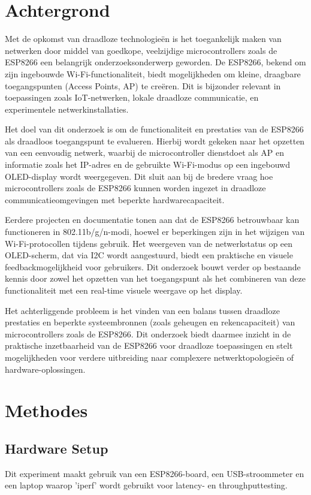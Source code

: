 \documentclass[conference]{IEEEtran}
\begin{document}
\section{Achtergrond}
Met de opkomst van draadloze technologieën is het toegankelijk maken van netwerken door middel van goedkope, veelzijdige microcontrollers zoals de ESP8266 een belangrijk onderzoeksonderwerp geworden. De ESP8266, bekend om zijn ingebouwde Wi-Fi-functionaliteit, biedt mogelijkheden om kleine, draagbare toegangspunten (Access Points, AP) te creëren. Dit is bijzonder relevant in toepassingen zoals IoT-netwerken, lokale draadloze communicatie, en experimentele netwerkinstallaties.

Het doel van dit onderzoek is om de functionaliteit en prestaties van de ESP8266 als draadloos toegangspunt te evalueren. Hierbij wordt gekeken naar het opzetten van een eenvoudig netwerk, waarbij de microcontroller dienstdoet als AP en informatie zoals het IP-adres en de gebruikte Wi-Fi-modus op een ingebouwd OLED-display wordt weergegeven. Dit sluit aan bij de bredere vraag hoe microcontrollers zoals de ESP8266 kunnen worden ingezet in draadloze communicatieomgevingen met beperkte hardwarecapaciteit.

Eerdere projecten en documentatie tonen aan dat de ESP8266 betrouwbaar kan functioneren in 802.11b/g/n-modi, hoewel er beperkingen zijn in het wijzigen van Wi-Fi-protocollen tijdens gebruik. Het weergeven van de netwerkstatus op een OLED-scherm, dat via I2C wordt aangestuurd, biedt een praktische en visuele feedbackmogelijkheid voor gebruikers. Dit onderzoek bouwt verder op bestaande kennis door zowel het opzetten van het toegangspunt als het combineren van deze functionaliteit met een real-time visuele weergave op het display.

Het achterliggende probleem is het vinden van een balans tussen draadloze prestaties en beperkte systeembronnen (zoals geheugen en rekencapaciteit) van microcontrollers zoals de ESP8266. Dit onderzoek biedt daarmee inzicht in de praktische inzetbaarheid van de ESP8266 voor draadloze toepassingen en stelt mogelijkheden voor verdere uitbreiding naar complexere netwerktopologieën of hardware-oplossingen. 

\section{Methodes}
\subsection{Hardware Setup}
Dit experiment maakt gebruik van een ESP8266-board, een USB-stroommeter en een laptop waarop 'iperf' wordt gebruikt voor latency- en throughputtesting.
\end{document}
